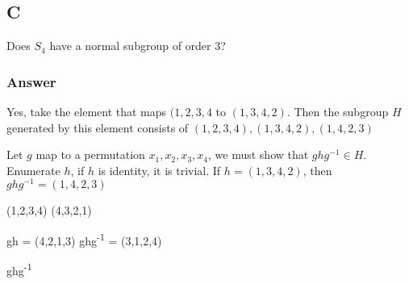 \documentclass[11pt]{article}
\begin{document}
\subsection{C}
\label{sec:orgece789c}


Does \(S_4\) have a normal subgroup of order 3?
\subsubsection{Answer}
\label{sec:org9af2816}

Yes, take the element that maps \((1,2,3,4\) to \((1, 3,4,2)\). Then the
subgroup \(H\) generated by this element consists of \((1,2,3,4), (1,3,4,2), (1,4,2,3)\)


Let \(g\) map to a permutation \(x_1, x_2, x_3, x_4\), we must show that
\(ghg^{-1} \in H\). Enumerate \(h\), if \(h\) is identity, it is trivial. If \(h
= (1,3,4,2)\), then \(ghg^{-1} = (1,4,2,3)\)

(1,2,3,4)
(4,3,2,1)


gh = (4,2,1,3)
ghg\textsuperscript{-1} = (3,1,2,4)



ghg\textsuperscript{-1}
\end{document}
